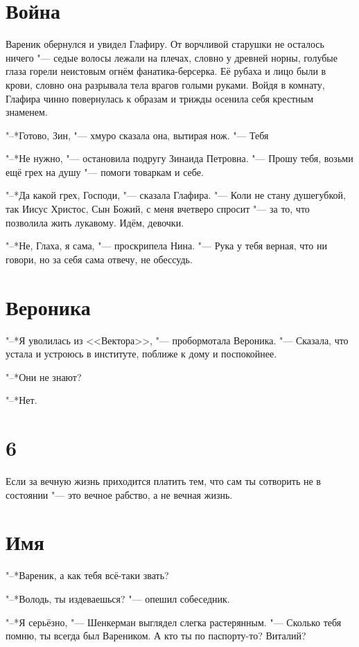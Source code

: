 \section{Война}

Вареник обернулся и увидел Глафиру.
От ворчливой старушки не осталось ничего "--- седые волосы лежали на плечах, словно у древней норны, голубые глаза горели неистовым огнём фанатика-берсерка.
Её рубаха и лицо были в крови, словно она разрывала тела врагов голыми руками.
Войдя в комнату, Глафира чинно повернулась к образам и трижды осенила себя крестным знаменем.

"--*Готово, Зин, "--- хмуро сказала она, вытирая нож.
"--- Тебя\ldotsq

"--*Не нужно, "--- остановила подругу Зинаида Петровна.
"--- Прошу тебя, возьми ещё грех на душу "--- помоги товаркам и себе.

"--*Да какой грех, Господи, "--- сказала Глафира.
"--- Коли не стану душегубкой, так Иисус Христос, Сын Божий, с меня вчетверо спросит "--- за то, что позволила жить лукавому.
Идём, девочки.

"--*Не, Глаха, я сама, "--- проскрипела Нина.
"--- Рука у тебя верная, что ни говори, но за себя сама отвечу, не обессудь.

\section{Вероника}

"--*Я уволилась из <<Вектора>>, "--- пробормотала Вероника.
"--- Сказала, что устала и устроюсь в институте, поближе к дому и поспокойнее.

"--*Они не знают?

"--*Нет.

\section{6}

Если за вечную жизнь приходится платить тем, что сам ты сотворить не в состоянии "--- это вечное рабство, а не вечная жизнь.

\section{Имя}

"--*Вареник, а как тебя всё-таки звать?

"--*Володь, ты издеваешься? "--- опешил собеседник.

"--*Я серьёзно, "--- Шенкерман выглядел слегка растерянным.
"--- Сколько тебя помню, ты всегда был Вареником.
А кто ты по паспорту-то?
Виталий?

